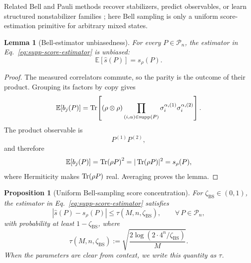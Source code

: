 \documentclass[
  aps,
  prx,
  reprint,
  superscriptaddress,
  amsmath,
  amssymb,
  nofootinbib,
  longbibliography
]{revtex4-2}
\newtheorem{proposition}[theorem]{Proposition}
\newtheorem{lemma}[theorem]{Lemma}
\newcommand{\supp}{\operatorname{supp}}
\newcommand{\Pc}{\mathcal{P}}
\begin{document}
Related Bell and Pauli methods recover stabilizers, predict observables, or
learn structured nonstabilizer families
\cite{Montanaro2017,KingGossetKothariBabbush2025,GrossNezamiWalter2021,GrewalIyerKretschmerLiang2024,HuangKuengPreskill2021,HangleiterGullans2024,lai2022learning,leone2024};
here Bell sampling is only a uniform score-estimation primitive for arbitrary
mixed states.

\begin{lemma}[Bell-estimator unbiasedness]
\label{lem:supp-bell-product-expectation}
For every $P\in\Pc_n$, the estimator in
Eq.~\eqref{eq:supp-score-estimator} is unbiased:
\begin{equation}
\mathbb E[\hat s(P)]=s_\rho(P).
\end{equation}
\end{lemma}

\begin{proof}
The measured correlators commute, so the parity is the outcome of their
product.  Grouping its factors by copy gives
\begin{equation}
\mathbb E[b_j(P)]
=
\Tr\!\left[
(\rho\otimes\rho)
\prod_{(i,\alpha)\in\supp(P)}
\sigma_i^{\alpha,(1)}\sigma_i^{\alpha,(2)}
\right].
\label{eq:supp-bell-joint-meas-identity}
\end{equation}
The product observable is
\begin{equation}
P^{(1)}P^{(2)},
\label{eq:supp-bell-product-observable}
\end{equation}
and therefore
\begin{equation}
\mathbb E[b_j(P)]
=
\Tr(\rho P)^2
=
|\Tr(\rho P)|^2
=
s_\rho(P),
\end{equation}
where Hermiticity makes $\Tr(\rho P)$ real.  Averaging proves the lemma.
\end{proof}

\begin{proposition}[Uniform Bell-sampling score concentration]
\label{prop:supp-uniform-concentration}
For $\zeta_{\mathrm{BS}}\in(0,1)$, the estimator in
Eq.~\eqref{eq:supp-score-estimator} satisfies
\begin{equation}
|\hat s(P)-s_\rho(P)|\le\tau(M,n,\zeta_{\mathrm{BS}}),
\qquad
\forall\,P\in\Pc_n,
\label{eq:supp-uniform-event}
\end{equation}
with probability at least $1-\zeta_{\mathrm{BS}}$, where
\begin{equation}
\tau(M,n,\zeta_{\mathrm{BS}})
:=
\sqrt{
\frac{2\log(2\cdot4^n/\zeta_{\mathrm{BS}})}{M}
}.
\label{eq:supp-tauM}
\end{equation}
When the parameters are clear from context, we write this quantity as
$\tau$.
\end{proposition}
\end{document}
